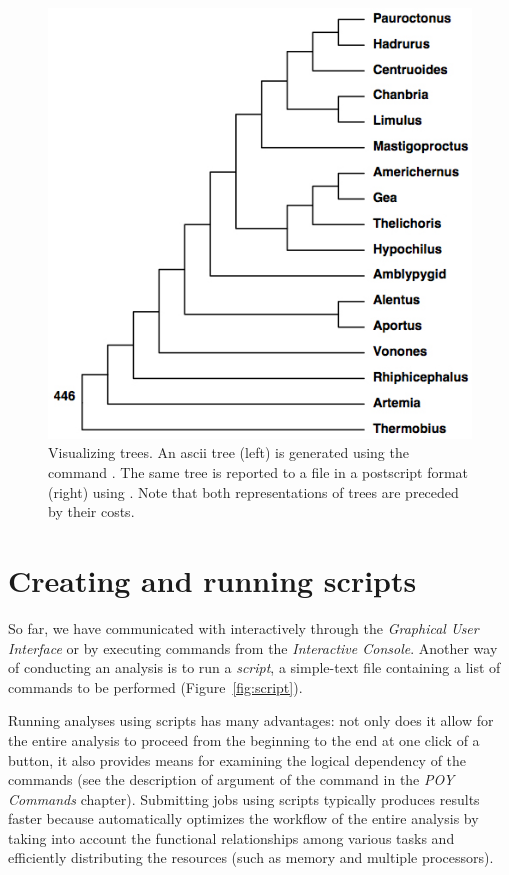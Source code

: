 \begin{figure}
\begin{minipage}[c]{0.5\textwidth}
	   	\includegraphics[width=\textwidth]{figures/pstree.jpg}
   	\end{minipage}
\caption{Visualizing trees. An ascii tree (left) is generated using the command . The same tree is reported to a file in a postscript format (right) using . Note that both representations of trees  are preceded by their costs.}
\label{fig:trees}
\end{figure}

\section{Creating and running \poy scripts}

So far, we have communicated with \poy interactively through the \emph{Graphical User Interface} or by executing commands from the \emph{Interactive Console}. Another way of conducting an analysis is to run a \emph{script}, a simple-text file containing a list of commands to be performed (Figure~\ref{fig:script}). 

Running analyses using scripts has many advantages: not only does it allow for the entire analysis to proceed from the beginning to the end at one click of a button, it also provides means for examining the logical dependency of the commands (see the description of  argument of the command  in the \emph{POY Commands} chapter). Submitting jobs using scripts typically produces results faster because \poy automatically optimizes the workflow of the entire analysis by taking into account the functional relationships among various tasks and efficiently distributing the resources (such as memory and multiple processors).

